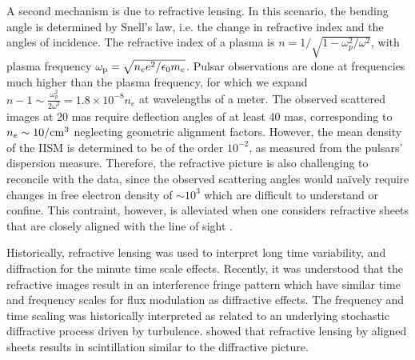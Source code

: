 \documentclass[useAMS,usenatbib]{mn2e}
\begin{document}
A second mechanism is due to refractive lensing.  In this scenario,
the bending angle is determined by Snell's law, i.e. the change in
refractive index and the angles of incidence.  The refractive index of
a plasma is $n=1/\sqrt{1-\omega_p^2/\omega^2}$, with plasma frequency
$\omega_{\rm p}=\sqrt{n_e e^2/\epsilon_{0}m_e}$.  Pulsar observations
are done at frequencies much higher than the plasma frequency, for which
we expand $n-1 \sim \frac{\omega_p^2}{2 \omega^2} = 1.8\times 10^{-8}
n_e$ at wavelengths of a meter.  The observed scattered images at 20
mas require deflection 
angles of at least 40 mas, corresponding to $n_e \sim 10/{\rm cm}^3$ neglecting
geometric alignment factors.  However, the mean density of the IISM is
determined to be
of the order $10^{-2}$, as measured  from the pulsars' dispersion measure\citep{2004hpa..book.....L}.
Therefore, the refractive picture is  also challenging to reconcile with the data, since the observed
scattering angles would na\"ively require changes in free electron
density of $\sim 10^3$ 
which are difficult to understand or confine. This contraint, however, is alleviated
when one considers refractive sheets that are closely aligned with the line of sight
\citep{2006ApJ...640L.159G}.

Historically, refractive lensing was used to interpret long time
variability, and diffraction for the minute time scale
effects. Recently, it was understood that the refractive images result
in an interference fringe pattern\citep{2004MNRAS.354...43W} which have
similar time and frequency scales for flux modulation as diffractive
effects.  The frequency and time scaling was historically interpreted
as related to an underlying stochastic diffractive process driven by
turbulence.
\cite{2006ApJ...640L.159G} showed that refractive lensing by aligned
sheets  results in
scintillation similar to the diffractive picture.




\end{document}

